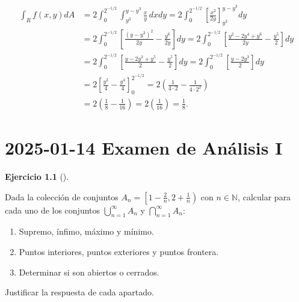\documentclass[
  a4paper,
]{scrreport}
\providecommand{\tightlist}{%
  \setlength{\itemsep}{0pt}\setlength{\parskip}{0pt}}\usepackage{longtable,booktabs,array}
\theoremstyle{definition}
\newtheorem{exercise}{Ejercicio}[chapter]
\theoremstyle{remark}
\begin{document}
\begin{tcolorbox}
\begin{align*}
\int_R f(x,y) dA 
&= 2\int_0^{2^{-1/2}} \int_{y^3}^{y-y^3} \frac{x}{y} \,dx dy 
= 2\int_0^{2^{-1/2}} \left[ \frac{x^2}{2y} \right]_{y^3}^{y-y^3} dy \\
&= 2\int_0^{2^{-1/2}} \left[ \frac{(y-y^3)^2}{2y} - \frac{y^6}{2y} \right] dy 
= 2\int_0^{2^{-1/2}} \left[ \frac{y^2-2y^4+y^6}{2y} - \frac{y^5}{2} \right] dy \\
&= 2\int_0^{2^{-1/2}} \left[ \frac{y-2y^3+y^5}{2} - \frac{y^5}{2} \right] dy 
= 2\int_0^{2^{-1/2}} \left[ \frac{y-2y^3}{2} \right] dy \\
&= 2\left[ \frac{y^2}{4} - \frac{y^4}{4} \right]_0^{2^{-1/2}} 
= 2\left( \frac{1}{4\cdot 2} - \frac{1}{4\cdot 2^2}  \right) \\
&= 2\left( \frac{1}{8} - \frac{1}{16} \right) 
= 2\left( \frac{1}{16} \right) 
= \frac{1}{8}.
\end{align*}

\end{tcolorbox}


\chapter{\texorpdfstring{2025-01-14 Examen de Análisis
I}{2025-01-14  Examen de Análisis I}}\label{examen-de-anuxe1lisis-i-5}

\begin{exercise}[]\protect\hypertarget{exr-1}{}\label{exr-1}

Dada la colección de conjuntos
\(A_n = \left[1-\frac{2}{n}, 2+\frac{1}{n}\right)\) con
\(n \in \mathbb{N}\), calcular para cada uno de los conjuntos
\(\bigcup_{n=1}^{\infty} A_n\) y \(\bigcap_{n=1}^{\infty} A_n\):

\begin{enumerate}
\def\labelenumi{\alph{enumi}.}
\tightlist
\item
  Supremo, ínfimo, máximo y mínimo.
\item
  Puntos interiores, puntos exteriores y puntos frontera.
\item
  Determinar si son abiertos o cerrados.
\end{enumerate}

Justificar la respuesta de cada apartado.

\end{exercise}
\end{document}
